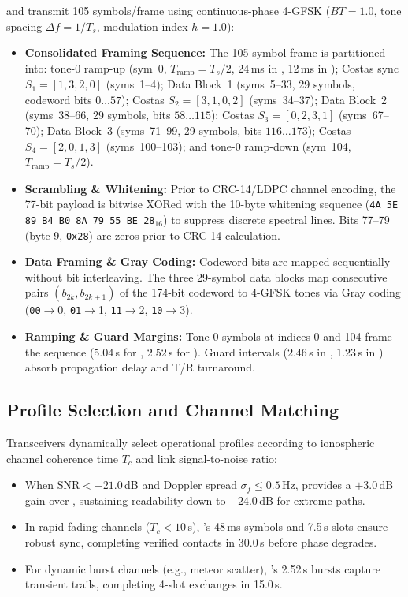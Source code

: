  and  transmit 105 symbols/frame using continuous-phase 4-GFSK ($BT = 1.0$, tone spacing $\Delta f = 1/T_s$, modulation index $h = 1.0$):
\begin{itemize}[leftmargin=1.2em, topsep=1.5pt plus 1.5pt minus 0.5pt, itemsep=0.8pt plus 1.2pt minus 0.4pt, parsep=0pt]
  \item \textbf{Consolidated Framing Sequence:} The 105-symbol frame is partitioned into: tone-0 ramp-up (sym~0, $T_{\text{ramp}} = T_s / 2$, 24\,ms in , 12\,ms in ); Costas sync $S_1 = [1, 3, 2, 0]$ (syms~1--4); Data Block~1 (syms~5--33, 29 symbols, codeword bits $0\dots 57$); Costas $S_2 = [3, 1, 0, 2]$ (syms~34--37); Data Block~2 (syms~38--66, 29 symbols, bits $58\dots 115$); Costas $S_3 = [0, 2, 3, 1]$ (syms~67--70); Data Block~3 (syms~71--99, 29 symbols, bits $116\dots 173$); Costas $S_4 = [2, 0, 1, 3]$ (syms~100--103); and tone-0 ramp-down (sym~104, $T_{\text{ramp}} = T_s / 2$).
  \item \textbf{Scrambling \& Whitening:} Prior to CRC-14/LDPC channel encoding, the 77-bit payload is bitwise XORed with the 10-byte whitening sequence (\texttt{4A 5E 89 B4 B0 8A 79 55 BE 28}$_{16}$) to suppress discrete spectral lines. Bits 77--79 (byte 9, \texttt{0x28}) are zeros prior to CRC-14 calculation.
  \item \textbf{Data Framing \& Gray Coding:} Codeword bits are mapped sequentially without bit interleaving. The three 29-symbol data blocks map consecutive pairs $(b_{2k}, b_{2k+1})$ of the 174-bit codeword to 4-GFSK tones via Gray coding (\texttt{00}$\to$0, \texttt{01}$\to$1, \texttt{11}$\to$2, \texttt{10}$\to$3).
  \item \textbf{Ramping \& Guard Margins:} Tone-0 symbols at indices 0 and 104 frame the sequence ($5.04$\,s for , $2.52$\,s for ). Guard intervals ($2.46$\,s in , $1.23$\,s in ) absorb propagation delay and T/R turnaround.
\end{itemize}

\subsection{Profile Selection and Channel Matching}
\label{sec:channel_matching}

Transceivers dynamically select operational profiles according to ionospheric channel coherence time $T_c$ and link signal-to-noise ratio:
\begin{itemize}[leftmargin=1.2em, topsep=1.5pt plus 1.5pt minus 0.5pt, itemsep=0.8pt plus 1.2pt minus 0.4pt, parsep=0pt]
  \item When $\text{SNR} < -21.0$\,dB and Doppler spread $\sigma_f \le 0.5$\,Hz,  provides a $+3.0$\,dB gain over , sustaining readability down to $-24.0$\,dB for extreme paths.
  \item In rapid-fading channels ($T_c < 10$\,s), 's 48\,ms symbols and 7.5\,s slots ensure robust sync, completing verified contacts in 30.0\,s before phase degrades.
  \item For dynamic burst channels (e.g., meteor scatter), 's 2.52\,s bursts capture transient trails, completing 4-slot exchanges in 15.0\,s.
\end{itemize}
\vspace*{-4.0pt}

